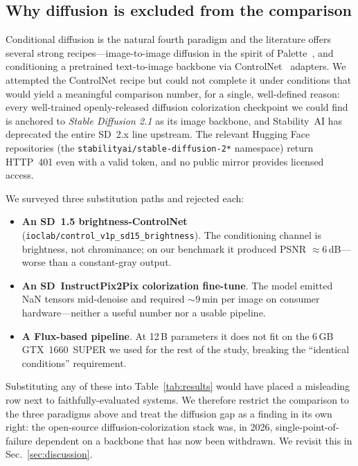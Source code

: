 \subsection{Why diffusion is excluded from the comparison}
\label{sec:experiments:no-diffusion}
Conditional diffusion is the natural fourth paradigm and the literature offers
several strong recipes---image-to-image diffusion in the spirit of
Palette~\cite{saharia2022palette}, and conditioning a pretrained text-to-image
backbone via ControlNet~\cite{zhang2023controlnet} adapters. We attempted the
ControlNet recipe but could not complete it under conditions that would yield
a meaningful comparison number, for a single, well-defined reason: every
well-trained openly-released diffusion colorization checkpoint we could find
is anchored to \emph{Stable Diffusion 2.1} as its image backbone, and
Stability~AI has deprecated the entire SD~2.x line upstream. The relevant
Hugging Face repositories (the \texttt{stabilityai/stable-diffusion-2*}
namespace) return HTTP~401 even with a valid token, and no public mirror
provides licensed access.

We surveyed three substitution paths and rejected each:
\begin{itemize}
  \item \textbf{An SD~1.5 brightness-ControlNet} (\texttt{ioclab/control\_v1p\_sd15\_\allowbreak brightness}).
        The conditioning channel is brightness, not chrominance; on our benchmark
        it produced PSNR ${\approx}6$\,dB---worse than a constant-gray output.
  \item \textbf{An SD~InstructPix2Pix colorization fine-tune}. The model emitted
        NaN tensors mid-denoise and required ${\sim}9$\,min per image on
        consumer hardware---neither a useful number nor a usable pipeline.
  \item \textbf{A Flux-based pipeline}. At 12\,B parameters it does not fit on
        the 6\,GB GTX~1660~SUPER we used for the rest of the study, breaking
        the ``identical conditions'' requirement.
\end{itemize}
Substituting any of these into Table~\ref{tab:results} would have placed a
misleading row next to faithfully-evaluated systems. We therefore restrict the
comparison to the three paradigms above and treat the diffusion gap as a
finding in its own right: the open-source diffusion-colorization stack was, in
2026, single-point-of-failure dependent on a backbone that has now been
withdrawn. We revisit this in Sec.~\ref{sec:discussion}.

